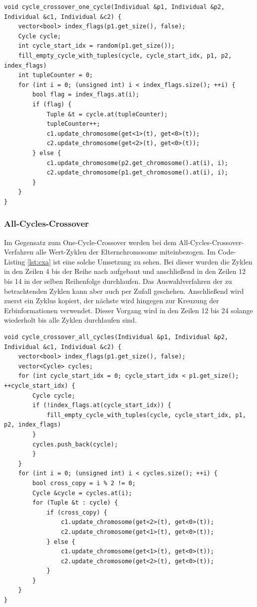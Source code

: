 \begin{minipage}[!htb]{\linewidth}
\begin{lstlisting}[caption={One-Cycle-Crossover}, firstnumber=1, captionpos=b, label=lst:cxo]
void cycle_crossover_one_cycle(Individual &p1, Individual &p2, Individual &c1, Individual &c2) {
	vector<bool> index_flags(p1.get_size(), false);
	Cycle cycle;
	int cycle_start_idx = random(p1.get_size());
	fill_empty_cycle_with_tuples(cycle, cycle_start_idx, p1, p2, index_flags)
	int tupleCounter = 0;
	for (int i = 0; (unsigned int) i < index_flags.size(); ++i) {
		bool flag = index_flags.at(i);
		if (flag) {
			Tuple &t = cycle.at(tupleCounter);
			tupleCounter++;
			c1.update_chromosome(get<1>(t), get<0>(t));
			c2.update_chromosome(get<2>(t), get<0>(t));
		} else {
 			c1.update_chromosome(p2.get_chromosome().at(i), i);
			c2.update_chromosome(p1.get_chromosome().at(i), i);
		}
	}
}
\end{lstlisting}
\end{minipage}

\subsubsection{All-Cycles-Crossover}
Im Gegensatz zum One-Cycle-Crossover werden bei dem All-Cycles-Crossover-Verfahren alle Wert-Zyklen der Elternchromosome miteinbezogen.
Im Code-Listing \ref{lst:cxa} ist eine solche Umsetzung zu sehen. Bei dieser wurden die Zyklen in den Zeilen 4 bis der Reihe nach aufgebaut und anschließend in den Zeilen 12 bis 14 in der selben Reihenfolge durchlaufen. 
Das Auswahlverfahren der zu betrachtenden Zyklen kann aber auch per Zufall geschehen. Anschließend wird zuerst ein Zyklus kopiert, der nächste wird hingegen zur Kreuzung der Erbinformationen verwendet. Dieser Vorgang wird in den Zeilen 12 bis 24 solange wiederholt bis alle Zyklen durchlaufen sind.

\begin{minipage}[!htb]{\linewidth}
\begin{lstlisting}[caption={All-Cycles-Crossover}, firstnumber=1, captionpos=b, label=lst:cxa]
void cycle_crossover_all_cycles(Individual &p1, Individual &p2, Individual &c1, Individual &c2) {
	vector<bool> index_flags(p1.get_size(), false);
	vector<Cycle> cycles;
	for (int cycle_start_idx = 0; cycle_start_idx < p1.get_size(); ++cycle_start_idx) {
		Cycle cycle;
		if (!index_flags.at(cycle_start_idx)) {
			fill_empty_cycle_with_tuples(cycle, cycle_start_idx, p1, p2, index_flags)
		}
		cycles.push_back(cycle);
		}
	}
	for (int i = 0; (unsigned int) i < cycles.size(); ++i) {
		bool cross_copy = i % 2 != 0;
		Cycle &cycle = cycles.at(i);
		for (Tuple &t : cycle) {
			if (cross_copy) {
				c1.update_chromosome(get<2>(t), get<0>(t));
				c2.update_chromosome(get<1>(t), get<0>(t));
			} else {
				c1.update_chromosome(get<1>(t), get<0>(t));	
 				c2.update_chromosome(get<2>(t), get<0>(t));
			}
		}
	}
}

\end{lstlisting}
\end{minipage}

